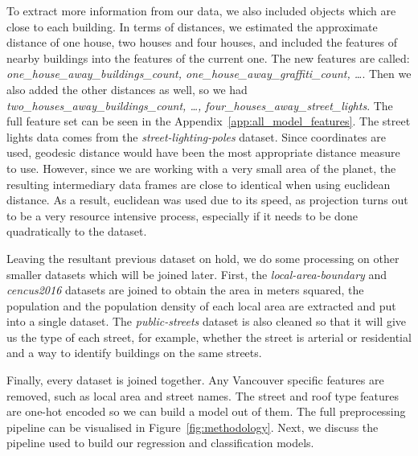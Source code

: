To extract more information from our data, we also included objects which are close to each building. In terms of distances, we estimated the approximate distance of one house, two houses and four houses, and included the features of nearby buildings into the features of the current one. The new features are called: \textit{one\_house\_away\_buildings\_count, one\_house\_away\_graffiti\_count, \ldots}. Then we also added the other distances as well, so we had \textit{two\_houses\_away\_buildings\_count, \ldots, four\_houses\_away\_street\_lights}. The full feature set can be seen in the Appendix~\ref{app:all_model_features}. The street lights data comes from the \textit{street-lighting-poles} dataset. Since coordinates are used, geodesic distance would have been the most appropriate distance measure to use. However, since we are working with a very small area of the planet, the resulting intermediary data frames are close to identical when using euclidean distance. As a result, euclidean was used due to its speed, as projection turns out to be a very resource intensive process, especially if it needs to be done quadratically to the dataset.

Leaving the resultant previous dataset on hold, we do some processing on other smaller datasets which will be joined later. First, the \textit{local-area-boundary} and \textit{cencus2016} datasets are joined to obtain the area in meters squared, the population and the population density of each local area are extracted and put into a single dataset. The \textit{public-streets} dataset is also cleaned so that it will give us the type of each street, for example, whether the street is arterial or residential and a way to identify buildings on the same streets.

Finally, every dataset is joined together. Any Vancouver specific features are removed, such as local area and street names. The street and roof type features are one-hot encoded so we can build a model out of them. The full preprocessing pipeline can be visualised in Figure~\ref{fig:methodology}. Next, we discuss the pipeline used to build our regression and classification models.

